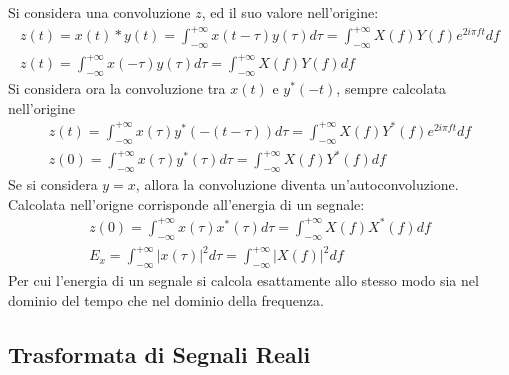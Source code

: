\documentclass{article}
\numberwithin{equation}{subsection}
\begin{document}
Si considera una convoluzione $z$, ed il suo valore nell'origine:
\begin{gather*}
    z(t)=x(t)*y(t)=\displaystyle\int_{-\infty}^{+\infty}x(t-\tau)y(\tau)d\tau=\int_{-\infty}^{+\infty}X(f)Y(f)e^{2i\pi ft}df\\
    z(t)=\displaystyle\int_{-\infty}^{+\infty}x(-\tau)y(\tau)d\tau=\int_{-\infty}^{+\infty}X(f)Y(f)df
\end{gather*}
Si considera ora la convoluzione tra $x(t)$ e $y^*(-t)$, sempre calcolata nell'origine
\begin{gather*}
    z(t)=\displaystyle\int_{-\infty}^{+\infty}x(\tau)y^*(-(t-\tau))d\tau=\int_{-\infty}^{+\infty}X(f)Y^*(f)e^{2i\pi ft}df\\
    z(0)=\displaystyle\int_{-\infty}^{+\infty}x(\tau)y^*(\tau)d\tau=\int_{-\infty}^{+\infty}X(f)Y^*(f)df
\end{gather*}
Se si considera $y=x$, allora la convoluzione diventa un'autoconvoluzione. Calcolata nell'origne corrisponde all'energia di un segnale:
\begin{gather*}
    z(0)=\displaystyle\int_{-\infty}^{+\infty}x(\tau)x^*(\tau)d\tau=\int_{-\infty}^{+\infty}X(f)X^*(f)df\\
    E_x=\displaystyle\int_{-\infty}^{+\infty}|x(\tau)|^2d\tau=\int_{-\infty}^{+\infty}|X(f)|^2df
\end{gather*}
Per cui l'energia di un segnale si calcola esattamente allo stesso modo sia nel dominio del tempo che nel dominio della frequenza. 

\subsection{Trasformata di Segnali Reali}
\end{document}
